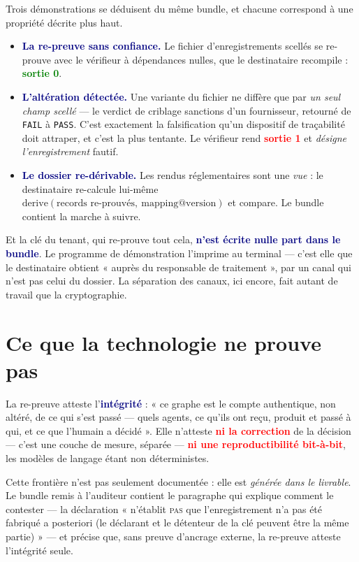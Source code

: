 \documentclass[10pt]{article}
\newcommand{\code}[1]{\texttt{\small #1}}
\newcommand{\mm}[1]{\textbf{\textcolor{navy}{#1}}}
\newcommand{\ok}[1]{\textcolor{green}{\textbf{#1}}}
\newcommand{\ko}[1]{\textcolor{red}{\textbf{#1}}}
\begin{document}
Trois démonstrations se déduisent du même bundle, et chacune correspond à une propriété décrite plus haut.

\begin{itemize}[leftmargin=13pt,itemsep=2.5pt,topsep=3pt]
\item \mm{La re-preuve sans confiance.} Le fichier d'enregistrements scellés se re-prouve avec le vérifieur à dépendances nulles, que le destinataire recompile : \ok{sortie 0}.
\item \mm{L'altération détectée.} Une variante du fichier ne diffère que par \emph{un seul champ scellé} — le verdict de criblage sanctions d'un fournisseur, retourné de \code{FAIL} à \code{PASS}. C'est exactement la falsification qu'un dispositif de traçabilité doit attraper, et c'est la plus tentante. Le vérifieur rend \ko{sortie 1} et \emph{désigne l'enregistrement} fautif.
\item \mm{Le dossier re-dérivable.} Les rendus réglementaires sont une \emph{vue} : le destinataire re-calcule lui-même $\mathrm{derive}(\text{records re-prouvés},\allowbreak\ \text{mapping@version})$ et compare. Le bundle contient la marche à suivre.
\end{itemize}

Et la clé du tenant, qui re-prouve tout cela, \mm{n'est écrite nulle part dans le bundle}. Le programme de démonstration l'imprime au terminal — c'est elle que le destinataire obtient « auprès du responsable de traitement », par un canal qui n'est pas celui du dossier. La séparation des canaux, ici encore, fait autant de travail que la cryptographie.

\section{Ce que la technologie ne prouve pas}\label{sec:limites}

\begin{alerte}
La re-preuve atteste l'\mm{intégrité} : « ce graphe est le compte authentique, non altéré, de ce qui s'est passé — quels agents, ce qu'ils ont reçu, produit et passé à qui, et ce que l'humain a décidé ». Elle n'atteste \ko{ni la correction} de la décision — c'est une couche de mesure, séparée — \ko{ni une reproductibilité bit-à-bit}, les modèles de langage étant non déterministes.
\end{alerte}

Cette frontière n'est pas seulement documentée : elle est \emph{générée dans le livrable}. Le bundle remis à l'auditeur contient le paragraphe qui explique comment le contester — la déclaration « n'établit \textsc{pas} que l'enregistrement n'a pas été fabriqué a posteriori (le déclarant et le détenteur de la clé peuvent être la même partie) » — et précise que, sans preuve d'ancrage externe, la re-preuve atteste l'intégrité seule.
\end{document}
